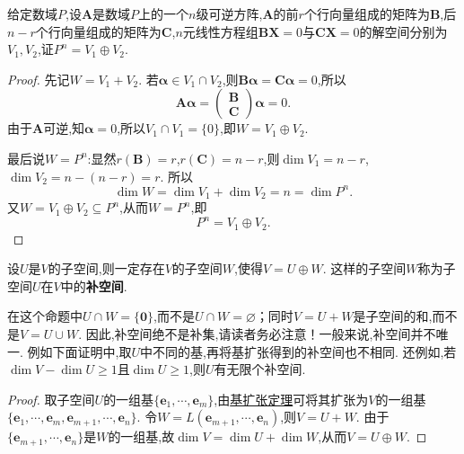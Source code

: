 \documentclass[../../main.tex]{subfiles}
\begin{document}
\begin{example}\label{example:561.16}
给定数域\(P\),设\(\boldsymbol{A}\)是数域\(P\)上的一个\(n\)级可逆方阵,\(\boldsymbol{A}\)的前\(r\)个行向量组成的矩阵为\(\boldsymbol{B}\),后\(n - r\)个行向量组成的矩阵为\(\boldsymbol{C}\),\(n\)元线性方程组\(\boldsymbol{B}\boldsymbol{X}=0\)与\(\boldsymbol{C}\boldsymbol{X}=0\)的解空间分别为\(V_1,V_2\),证\(P^n = V_1\oplus V_2\).
\end{example}
\begin{proof}
先记\(W = V_1 + V_2\). 若\(\boldsymbol{\alpha}\in V_1\cap V_2\),则\(\boldsymbol{B}\boldsymbol{\alpha}=\boldsymbol{C}\boldsymbol{\alpha}=0\),所以
\[
\boldsymbol{A}\boldsymbol{\alpha}=\begin{pmatrix}
\boldsymbol{B}\\
\boldsymbol{C}
\end{pmatrix}\boldsymbol{\alpha}=0.
\]
由于\(\boldsymbol{A}\)可逆,知\(\boldsymbol{\alpha}=0\),所以\(V_1\cap V_1 = \{0\}\),即\(W = V_1\oplus V_2\).

最后说\(W = P^n\):显然\(r(\boldsymbol{B}) = r\),\(r(\boldsymbol{C}) = n - r\),则\(\dim V_1 = n - r\),\(\dim V_2 = n-(n - r)=r\). 所以
\[
\dim W=\dim V_1+\dim V_2=n=\dim P^n.
\]
又\(W = V_1\oplus V_2\subseteq P^n\),从而\(W = P^n\),即
\[
P^n = V_1\oplus V_2.
\]  
\end{proof}


\begin{proposition}[任意子空间一定存在相应的补空间]\label{proposition:补空间}
设\(U\)是\(V\)的子空间,则一定存在\(V\)的子空间\(W\),使得\(V = U\oplus W\). 这样的子空间\(W\)称为子空间\(U\)在\(V\)中的\textbf{补空间}.
\end{proposition}
\begin{remark}
在这个命题中\(U\cap W = \{ \boldsymbol{0}\}\),而不是\(U\cap W=\varnothing\)；同时\(V = U + W\)是子空间的和,而不是\(V = U\cup W\). 因此,补空间绝不是补集,请读者务必注意！一般来说,补空间并不唯一. 例如下面证明中,取$U$中不同的基,再将基扩张得到的补空间也不相同.
还例如,若\(\dim V-\dim U\geqslant 1\)且\(\dim U\geqslant 1\),则\(U\)有无限个补空间.
\end{remark}
\begin{proof}
取子空间\(U\)的一组基\(\{\boldsymbol{e}_1,\cdots,\boldsymbol{e}_m\}\),由\hyperref[theorem:基扩充定理]{基扩张定理}可将其扩张为\(V\)的一组基\(\{\boldsymbol{e}_1,\cdots,\boldsymbol{e}_m,\boldsymbol{e}_{m + 1},\cdots,\boldsymbol{e}_n\}\). 令\(W = L(\boldsymbol{e}_{m + 1},\cdots,\boldsymbol{e}_n)\),则\(V = U+W\). 由于\(\{\boldsymbol{e}_{m + 1},\cdots,\boldsymbol{e}_n\}\)是\(W\)的一组基,故\(\dim V=\dim U+\dim W\),从而\(V = U\oplus W\). 
\end{proof}
\end{document}
